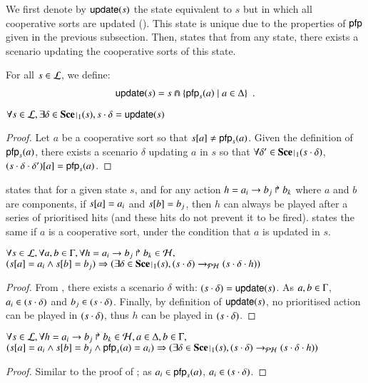 We first denote by $\mathsf{update}(s)$ the state equivalent to $s$ but in which all cooperative sorts are updated ().
This state is unique due to the properties of $\mathsf{pfp}$ given in the previous subsection.
Then,  states that from any state, there exists a scenario updating the cooperative sorts of this state.
%
\begin{definition}[$\update : \PHl \rightarrow \PHl$]
\label{def:update}
  For all $s \in \mathcal{L}$, we define:
  \begin{align*}
    \mathsf{update}(s) = s \Cap \{ \mathsf{pfp}_{s}(a) \mid a \in \Delta \} \enspace.
  \end{align*}
\end{definition}
%
\begin{lemma}
\label{lem:update}
  $\forall s \in \PHl, \exists \delta \in \restriction{\Sce}{1}(s), s \PHplay \delta = \update(s)$
\end{lemma}
%
\begin{proof}
  Let $a$ be a cooperative sort so that ${s[a]} \neq \mathsf{pfp}_s(a)$.
  Given the definition of $\mathsf{pfp}_s(a)$, there exists a scenario $\delta$ updating $a$ in $s$ so that
  $\forall \delta' \in \restriction{\Sce}{1}(s \PHplay \delta)$, ${(s \cdot \delta \cdot \delta')[a]} = \mathsf{pfp}_s(a)$.
\end{proof}

 states that for a given state $s$, and for any action $h = a_i\rightarrow b_j\Rsh b_k$ where $a$ and $b$ are components,
if ${s[a]} = a_i$ and ${s[b]} = b_j$, then
$h$ can always be played after a series of prioritised hits (and these hits do not prevent it to be fired).
 states the same if $a$ is a cooperative sort, under the condition that $a$ is updated in $s$.
\begin{lemma}
\label{lem:hcompcomp}
  $\forall s \in \mathcal{L}, \forall a,b \in \Gamma, \forall h = a_i\rightarrow b_j\Rsh b_k \in \mathcal{H},$\\
  $(\PHget{s}{a} = a_i \wedge \PHget{s}{b} = b_j) \Rightarrow (\exists \delta \in \restriction{\Sce}{1}(s),
  (s \PHplay \delta) \PHPtrans (s \PHplay \delta \PHplay h))$
\end{lemma}
%
\begin{proof}
  From , there exists a scenario $\delta$ with: $(s \cdot \delta) = \mathsf{update}(s)$.
  As $a,b \in \Gamma$, $a_i \in (s \cdot \delta)$ and $b_j \in (s \cdot \delta)$.
  Finally, by definition of $\mathsf{update}(s)$, no prioritised action can be played in $(s \cdot \delta)$, thus $h$ can be played in $(s \cdot \delta)$.
\end{proof}
%
\begin{lemma}
\label{lem:hcscomp}
  $\forall s \in \mathcal{L}, \forall h = a_i\rightarrow b_j\Rsh b_k \in \mathcal{H}, a \in \Delta, b \in \Gamma,$\\
  $(\PHget{s}{a} = a_i \wedge \PHget{s}{b} = b_j \wedge \pfp_s(a) = a_i) \Rightarrow (\exists \delta \in \restriction{\Sce}{1}(s),
  (s \PHplay \delta) \PHPtrans (s \PHplay \delta \PHplay h))$
\end{lemma}
\begin{proof}
  Similar to the proof of ;
  as $a_i \in \mathsf{pfp}_s(a)$, $a_i \in (s \cdot \delta)$.
\end{proof}
